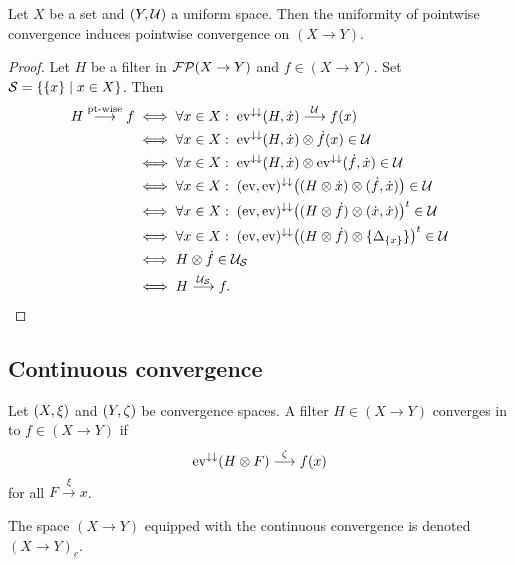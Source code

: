 \begin{lemma}
Let $X$ be a set and $\left( Y, \mathcal{U} \right)$ a uniform space. Then the uniformity of pointwise convergence induces pointwise convergence on $(X\to Y)$.
\end{lemma}
\begin{proof}
Let $H$ be a filter in $\operatorname{\mathcal{FP}}(X\to Y)$ and $f\in (X\to Y)$. Set $\mathcal{S} = \left\{ \{x\} \;\middle|\; x\in X \right\}$. Then
\begin{align*}
H\overset{\text{pt-wise}}{\longrightarrow} f &\iff \forall x\in X: \; \operatorname{ev}^{\downarrow\downarrow}(H, \dot{x}) \overset{\mathcal{U}}{\longrightarrow} f(x) \\
&\iff \forall x\in X: \; \operatorname{ev}^{\downarrow\downarrow}(H, \dot{x}) \otimes \dot{f}(x) \in\mathcal{U} \\
&\iff \forall x\in X: \; \operatorname{ev}^{\downarrow\downarrow}(H, \dot{x}) \otimes \operatorname{ev}^{\downarrow\downarrow}(\dot{f}, \dot{x}) \in\mathcal{U} \\
&\iff \forall x\in X: \; (\operatorname{ev}, \operatorname{ev})^{\downarrow\downarrow}\big((H\otimes \dot{x}) \otimes (\dot{f}, \dot{x})\big) \in\mathcal{U} \\
&\iff \forall x\in X: \; (\operatorname{ev}, \operatorname{ev})^{\downarrow\downarrow}\big((H\otimes \dot{f}) \otimes (\dot{x}, \dot{x})\big)^t \in\mathcal{U} \\
&\iff \forall x\in X: \; (\operatorname{ev}, \operatorname{ev})^{\downarrow\downarrow}\big((H\otimes \dot{f}) \otimes \{\Delta_{\{x\}}\}\big)^t \in\mathcal{U} \\
&\iff H\otimes \dot{f} \in \mathcal{U}_\mathcal{S} \\
&\iff H \overset{\mathcal{U}_\mathcal{S}}{\longrightarrow} f.
\end{align*}
\end{proof}

\subsection{Continuous convergence}
\begin{definition}
Let $\left( X,\xi \right)$ and $\left( Y,\zeta \right)$ be convergence spaces. A filter $H\in(X\to Y)$ converges in  to $f\in(X\to Y)$ if
\[ \operatorname{ev}^{\downarrow\downarrow}(H\otimes F) \overset{\zeta}{\longrightarrow} f(x) \]
for all $F\overset{\xi}{\longrightarrow} x$.

The space $(X\to Y)$ equipped with the continuous convergence is denoted $(X \to Y)_c$.
\end{definition}

